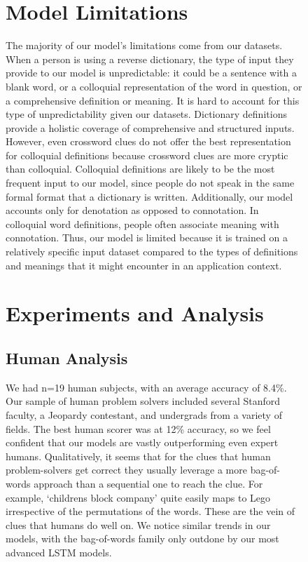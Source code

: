 \documentclass{article} %
\begin{document}
\begin{figure}
\section{Model Limitations}
The majority of our model’s limitations come from our datasets. When a person is using a reverse dictionary, the type of input they provide to our model is unpredictable: it could be a sentence with a blank word, or a colloquial representation of the word in question, or a comprehensive definition or meaning. It is hard to account for this type of unpredictability given our datasets. Dictionary definitions provide a holistic coverage of comprehensive and structured inputs. However, even crossword clues do not offer the best representation for colloquial definitions because crossword clues are more cryptic than colloquial. 
Colloquial definitions are likely to be the most frequent input to our model, since people do not speak in the same formal format that a dictionary is written. Additionally, our model accounts only for denotation as opposed to connotation. In colloquial word definitions, people often associate meaning with connotation. Thus, our model is limited because it is trained on a relatively specific input dataset compared to the types of definitions and meanings that it might encounter in an application context.

\section{Experiments and Analysis}

\subsection{Human Analysis}
We had n=19 human subjects, with an average accuracy of 8.4\%. Our sample of human problem solvers included several Stanford faculty, a Jeopardy contestant, and undergrads from a variety of fields. The best human scorer was at 12\% accuracy, so we feel confident that our models are vastly outperforming even expert humans.
Qualitatively, it seems that for the clues that human problem-solvers get correct they usually leverage a more bag-of-words approach than a sequential one to reach the clue. For example, ‘childrens block company’ quite easily maps to Lego irrespective of the permutations of the words. These are the vein of clues that humans do well on. We notice similar trends in our models, with the bag-of-words family only outdone by our most advanced LSTM models.


\end{figure}
\end{document}
